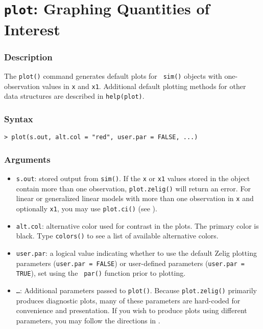 \section{{\tt plot}: Graphing Quantities of Interest}\label{ss:plot.zelig}

\subsubsection{Description}
The \texttt{plot()} command generates default plots for {\tt
  sim()} objects with one-observation values in {\tt x} and {\tt x1}.
  Additional default plotting methods for other data structures are
  described in {\tt help(plot)}.  

\subsubsection{Syntax}
\begin{verbatim}
> plot(s.out, alt.col = "red", user.par = FALSE, ...)
\end{verbatim}

\subsubsection{Arguments}
\begin{itemize}
\item{\tt s.out}: stored output from {\tt sim()}.  If the {\tt x} or
  {\tt x1} values stored in the object contain more than one
  observation, {\tt plot.zelig()} will return an error.  For linear or
  generalized linear models with more than one observation in {\tt x}
  and optionally {\tt x1}, you may use {\tt plot.ci()} (see ).
\item{\tt alt.col}: alternative color used for contrast in the plots.
  The primary color is black.  Type {\tt colors()} to see a list of
  available alternative colors.
\item{\tt user.par}: a logical value indicating whether to use the
  default Zelig plotting parameters ({\tt user.par = FALSE}) or
  user-defined parameters ({\tt user.par = TRUE}), set using the {\tt
    par()} function prior to plotting.
\item{\tt \dots}: Additional parameters passed to {\tt plot()}.
  Because {\tt plot.zelig()} primarily produces diagnostic plots, many
  of these parameters are hard-coded for convenience and
  presentation.  If you wish to produce plots using different
  parameters, you may follow the directions in .  
\end{itemize}

